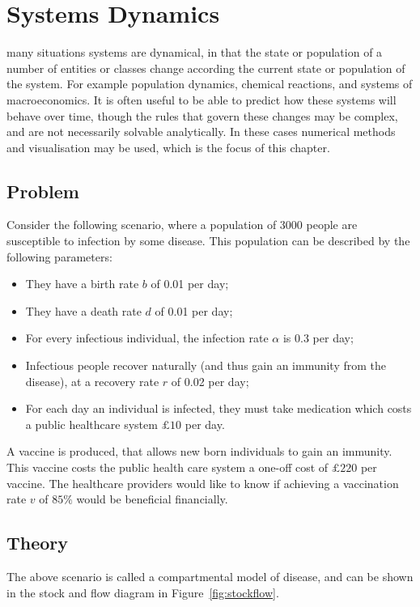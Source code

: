\chapter[Systems dynamics]{Systems Dynamics}

 many situations systems are dynamical, in that the state
or population of a number of entities or classes change according the current
state or population of the system. For example population dynamics, chemical
reactions, and systems of macroeconomics. It is often useful to be able to
predict how these systems will behave over time, though the rules that govern
these changes may be complex, and are not necessarily solvable analytically. In
these cases numerical methods and visualisation may be used, which is the focus
of this chapter.

\section{Problem}\label{sec:problem}
Consider the following scenario, where a population of 3000 people are
susceptible to infection by some disease. This population can be described by
the following parameters:

\begin{itemize}
  \item They have a birth rate $b$ of 0.01 per day;
  \item They have a death rate $d$ of 0.01 per day;
  \item For every infectious individual, the infection rate $\alpha$ is 0.3 per
  day;
  \item Infectious people recover naturally (and thus gain an immunity from the
  disease), at a recovery rate $r$ of 0.02 per day;
  \item For each day an individual is infected, they must take medication which
  costs a public healthcare system $\pounds 10$ per day.
\end{itemize}

A vaccine is produced, that allows new born individuals to gain an immunity.
This vaccine costs the public health care system a one-off cost of
$\pounds 220$ per vaccine. The healthcare providers would like to know if
achieving a vaccination rate $v$ of $85\%$ would be beneficial financially.

\section{Theory}\label{sec:theory}
The above scenario is called a compartmental model of disease, and can be shown
in the stock and flow diagram in Figure~\ref{fig:stockflow}.

